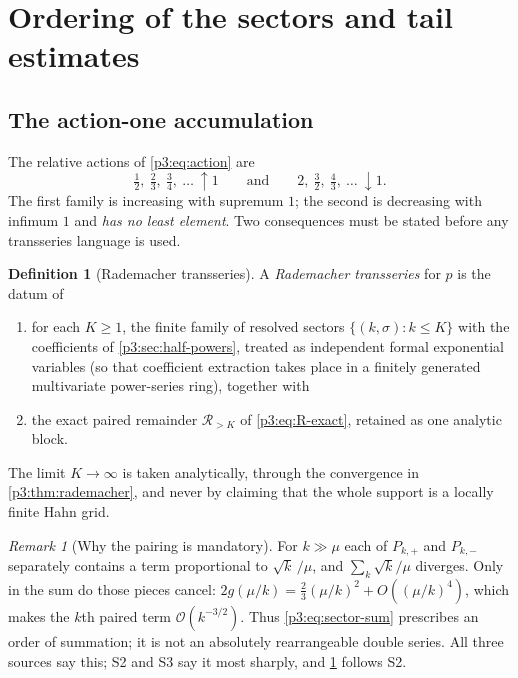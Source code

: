 \documentclass[11pt,a4paper,oneside]{book}
\theoremstyle{plain}
\theoremstyle{definition}
\newtheorem{definition}[theorem]{Definition}
\theoremstyle{remark}
\newtheorem{remark}[theorem]{Remark}
\newcommand{\bigO}{\mathcal{O}}
\begin{document}
\section{Ordering of the sectors and tail estimates}\label{p3:sec:tail}

\subsection{The action-one accumulation}

The relative actions of \cref{p3:eq:action} are
\[
\tfrac12,\ \tfrac23,\ \tfrac34,\ \dots\ \uparrow 1 \qquad\text{and}\qquad 2,\ \tfrac32,\
\tfrac43,\ \dots\ \downarrow 1 .
\]
The first family is increasing with supremum $1$; the second is decreasing with infimum $1$ and
\emph{has no least element}. Two consequences must be stated before any transseries language is
used.

\begin{definition}[Rademacher transseries]\label{p3:def:rademacher-transseries}
A \emph{Rademacher transseries} for $p$ is the datum of
\begin{enumerate}
\item for each $K\ge1$, the finite family of resolved sectors
$\{(k,\sigma):k\le K\}$ with the coefficients of \cref{p3:sec:half-powers}, treated as independent
formal exponential variables (so that coefficient extraction takes place in a finitely generated
multivariate power-series ring), together with
\item the exact paired remainder $\mathcal{R}_{>K}$ of \cref{p3:eq:R-exact}, retained
as one analytic block.
\end{enumerate}
The limit $K\to\infty$ is taken analytically, through the convergence in \cref{p3:thm:rademacher},
and never by claiming that the whole support is a locally finite Hahn grid.
\end{definition}

\begin{remark}[Why the pairing is mandatory]\label{p3:rem:pairing}
For $k\gg\mu$ each of $P_{k,+}$ and $P_{k,-}$ separately contains a term proportional to $\sqrt
k\,/\mu$, and $\sum_{k}\sqrt k/\mu$ diverges. Only in the sum do those pieces cancel:
$2g(\mu/k)=\tfrac23(\mu/k)^{2}+O((\mu/k)^{4})$, which makes the $k$th paired term
$\bigO(k^{-3/2})$. Thus \cref{p3:eq:sector-sum} prescribes an order of summation; it is not
an absolutely rearrangeable double series. All three sources say this; S2 and S3 say it most
sharply, and \cref{p3:def:rademacher-transseries} follows S2.
\end{remark}
\end{document}
